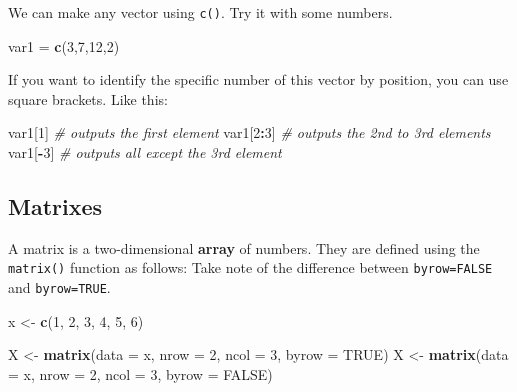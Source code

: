 \documentclass[
]{book}
\newenvironment{Shaded}{\begin{snugshade}}{\end{snugshade}}
\newcommand{\AttributeTok}[1]{\textcolor[rgb]{0.13,0.29,0.53}{#1}}
\newcommand{\CommentTok}[1]{\textcolor[rgb]{0.56,0.35,0.01}{\textit{#1}}}
\newcommand{\ConstantTok}[1]{\textcolor[rgb]{0.56,0.35,0.01}{#1}}
\newcommand{\DecValTok}[1]{\textcolor[rgb]{0.00,0.00,0.81}{#1}}
\newcommand{\FunctionTok}[1]{\textcolor[rgb]{0.13,0.29,0.53}{\textbf{#1}}}
\newcommand{\NormalTok}[1]{#1}
\newcommand{\OtherTok}[1]{\textcolor[rgb]{0.56,0.35,0.01}{#1}}
\newcommand{\SpecialCharTok}[1]{\textcolor[rgb]{0.81,0.36,0.00}{\textbf{#1}}}
\begin{document}
We can make any vector using \texttt{c()}.
Try it with some numbers.

\begin{Shaded}
\begin{Highlighting}[]
\NormalTok{var1 }\OtherTok{=} \FunctionTok{c}\NormalTok{(}\DecValTok{3}\NormalTok{,}\DecValTok{7}\NormalTok{,}\DecValTok{12}\NormalTok{,}\DecValTok{2}\NormalTok{)}
\end{Highlighting}
\end{Shaded}

If you want to identify the specific number of this vector by position, you can use square brackets.
Like this:

\begin{Shaded}
\begin{Highlighting}[]
\NormalTok{var1[}\DecValTok{1}\NormalTok{]     }\CommentTok{\# outputs the first element}
\NormalTok{var1[}\DecValTok{2}\SpecialCharTok{:}\DecValTok{3}\NormalTok{]   }\CommentTok{\# outputs the 2nd to 3rd elements}
\NormalTok{var1[}\SpecialCharTok{{-}}\DecValTok{3}\NormalTok{]    }\CommentTok{\# outputs all except the 3rd element}
\end{Highlighting}
\end{Shaded}

\hypertarget{matrixes}{%
\subsection*{Matrixes}\label{matrixes}}

A matrix is a two-dimensional \textbf{array} of numbers.
They are defined using the \texttt{matrix()} function as follows: Take note of the difference between \texttt{byrow=FALSE} and \texttt{byrow=TRUE}.

\begin{Shaded}
\begin{Highlighting}[]
\NormalTok{x }\OtherTok{\textless{}{-}} \FunctionTok{c}\NormalTok{(}\DecValTok{1}\NormalTok{, }\DecValTok{2}\NormalTok{, }\DecValTok{3}\NormalTok{, }\DecValTok{4}\NormalTok{, }\DecValTok{5}\NormalTok{, }\DecValTok{6}\NormalTok{)}

\NormalTok{X }\OtherTok{\textless{}{-}} \FunctionTok{matrix}\NormalTok{(}\AttributeTok{data =}\NormalTok{ x, }\AttributeTok{nrow =} \DecValTok{2}\NormalTok{, }\AttributeTok{ncol =} \DecValTok{3}\NormalTok{, }\AttributeTok{byrow =} \ConstantTok{TRUE}\NormalTok{)}
\NormalTok{X }\OtherTok{\textless{}{-}} \FunctionTok{matrix}\NormalTok{(}\AttributeTok{data =}\NormalTok{ x, }\AttributeTok{nrow =} \DecValTok{2}\NormalTok{, }\AttributeTok{ncol =} \DecValTok{3}\NormalTok{, }\AttributeTok{byrow =} \ConstantTok{FALSE}\NormalTok{)}
\end{Highlighting}
\end{Shaded}
\end{document}
